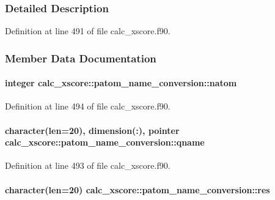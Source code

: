 \subsubsection{Detailed Description}


Definition at line 491 of file calc\-\_\-xscore.\-f90.



\subsubsection{Member Data Documentation}
\hypertarget{structcalc__xscore_1_1patom__name__conversion_a9c49f304081167755513549a8ddea5d8}{
\paragraph[{natom}]{\setlength{\rightskip}{0pt plus 5cm}integer calc\-\_\-xscore\-::patom\-\_\-name\-\_\-conversion\-::natom}}\label{structcalc__xscore_1_1patom__name__conversion_a9c49f304081167755513549a8ddea5d8}


Definition at line 494 of file calc\-\_\-xscore.\-f90.

\hypertarget{structcalc__xscore_1_1patom__name__conversion_af0ad5c58744e577cc9f17f6826bb2ca1}{
\paragraph[{qname}]{\setlength{\rightskip}{0pt plus 5cm}character(len=20), dimension(\-:), pointer calc\-\_\-xscore\-::patom\-\_\-name\-\_\-conversion\-::qname}}\label{structcalc__xscore_1_1patom__name__conversion_af0ad5c58744e577cc9f17f6826bb2ca1}


Definition at line 493 of file calc\-\_\-xscore.\-f90.

\hypertarget{structcalc__xscore_1_1patom__name__conversion_ac2aa06cd2394b1f6383a3ff9179f2411}{
\paragraph[{res}]{\setlength{\rightskip}{0pt plus 5cm}character(len=20) calc\-\_\-xscore\-::patom\-\_\-name\-\_\-conversion\-::res}}\label{structcalc__xscore_1_1patom__name__conversion_ac2aa06cd2394b1f6383a3ff9179f2411}


